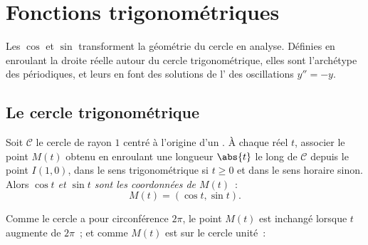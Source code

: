 \chapter{Fonctions trigonométriques}\label{ch:g12:trigo}

Les  $\cos$ et $\sin$ transforment la géométrie du cercle en
analyse. Définies en enroulant la droite réelle autour du cercle
trigonométrique, elles sont l'archétype des  périodiques, et leurs
 en font des solutions de l' des oscillations $y'' = -y$.

\section{Le cercle trigonométrique}

\begin{definition}\label{def:g12:trigo:cossin}
Soit $\mathcal{C}$ le cercle de rayon $1$ centré à l'origine d'un . À chaque réel $t$, associer le point $M(t)$ obtenu en
enroulant une longueur $\abs{t}$ le long de $\mathcal{C}$ depuis le point
$I(1,0)$, dans le sens trigonométrique si $t \geq 0$ et dans le sens
horaire sinon. Alors \emph{$\cos t$ et $\sin t$ sont les coordonnées de
$M(t)$}~:
\[
M(t) = (\cos t, \sin t).
\]
\end{definition}

\begin{omfigure}
\end{omfigure}

Comme le cercle a pour circonférence $2\pi$, le point $M(t)$ est inchangé
lorsque $t$ augmente de $2\pi$~; et comme $M(t)$ est sur le cercle
unité~:

